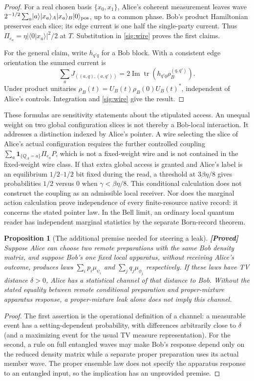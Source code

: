 \documentclass[11pt,a4paper]{article}
\newtheorem{proposition}[theorem]{Proposition}
\theoremstyle{definition}
\theoremstyle{remark}\newtheorem{remark}[theorem]{Remark}
\newcommand{\status}[1]{\textbf{[#1]}\quad}
\newcommand{\tr}{\operatorname{tr}}
\newcommand{\ket}[1]{\lvert#1\rangle}
\begin{document}
\begin{proof}
For a real chosen basis $\{x_0,x_1\}$, Alice's coherent measurement
leaves wave
$2^{-1/2}\sum_a\ket a\ket{x_a}_A\ket{x_a}_B\ket0_{\rm pos}$,
up to a common phase. Bob's product Hamiltonian preserves each slice;
its edge current is one half the single-party current. Thus
$\Pi_{e_a}=\eta|\langle0|x_a\rangle|^2/2$ at $T$. Substitution in
\eqref{sig:wire} proves the first claims.

For the general claim, write $h_{q'q}$ for a Bob block. With a
consistent edge orientation the summed current is
\[
 \sum_a J_{((a,q),(a,q'))}
 =2\operatorname{Im}\tr\!\left(h_{q'q}\rho_B^{(q,q')}\right).
\]
Under product unitaries $\rho_B(t)=U_B(t)\rho_B(0)U_B(t)^*$,
independent of Alice's controls. Integration and
\eqref{sig:wire} give the result.
\end{proof}

These formulas are sensitivity statements about the stipulated access.
An unequal weight on two global configuration slices is not thereby a
Bob-local interaction. It addresses a distinction indexed by Alice's
pointer. A wire selecting the slice of Alice's actual configuration
requires the further controlled coupling
$\sum_a\mathbf1_{\{Q_A=a\}}\Pi_{e_a}P$, which is not a fixed-weight
wire and is not contained in the fixed-weight wire class.
If that extra global access is granted and Alice's label is an
equilibrium $1/2$--$1/2$ bit fixed during the read, a threshold at
$3\beta\eta/8$ gives probabilities $1/2$ versus $0$ when
$\gamma<\beta\eta/8$. This conditional calculation does not construct
the coupling as an admissible local receiver. Nor does the marginal
action calculation prove independence of every finite-resource native
record: it concerns the stated pointer law. In the Bell limit, an
ordinary local quantum reader has independent marginal statistics by
the separate Born-record theorem.

\begin{proposition}[The additional premise needed for steering a leak]
\label{sig:steering}
\status{Proved}
Suppose Alice can choose two remote preparations with the same Bob
density matrix, and suppose Bob's one fixed local apparatus, without
receiving Alice's outcome, produces laws
$\sum_i p_i\mu_{\psi_i}$ and $\sum_jq_j\mu_{\phi_j}$ respectively.
If these laws have TV distance $\delta>0$, Alice has a statistical
channel of that distance to Bob. Without the stated equality between
remote conditional preparation and proper-mixture apparatus response,
a proper-mixture leak alone does not imply this channel.
\end{proposition}
\begin{proof}
The first assertion is the operational definition of a channel: a
measurable event has a setting-dependent probability, with differences
arbitrarily close to $\delta$ (and a maximizing event for the usual TV
measure representation). For the second, a rule on full entangled waves
may make Bob's response depend only on the reduced density matrix while
a separate proper preparation uses its actual member wave. The proper
ensemble law does not specify the apparatus response to an entangled
input, so the implication has an unprovided premise.
\end{proof}
\end{document}
